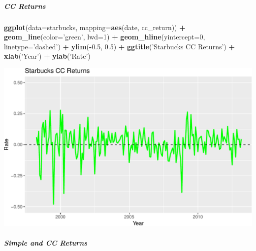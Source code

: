 \documentclass[]{article}
\newenvironment{Shaded}{\begin{snugshade}}{\end{snugshade}}
\newcommand{\KeywordTok}[1]{\textcolor[rgb]{0.13,0.29,0.53}{\textbf{#1}}}
\newcommand{\DataTypeTok}[1]{\textcolor[rgb]{0.13,0.29,0.53}{#1}}
\newcommand{\DecValTok}[1]{\textcolor[rgb]{0.00,0.00,0.81}{#1}}
\newcommand{\FloatTok}[1]{\textcolor[rgb]{0.00,0.00,0.81}{#1}}
\newcommand{\StringTok}[1]{\textcolor[rgb]{0.31,0.60,0.02}{#1}}
\newcommand{\OperatorTok}[1]{\textcolor[rgb]{0.81,0.36,0.00}{\textbf{#1}}}
\newcommand{\NormalTok}[1]{#1}
\let\oldsubparagraph\subparagraph
\renewcommand{\subparagraph}[1]{\oldsubparagraph{#1}\mbox{}}
\begin{document}
\subparagraph{CC Returns}\label{cc-returns}

\begin{Shaded}
\begin{Highlighting}[]
\KeywordTok{ggplot}\NormalTok{(}\DataTypeTok{data=}\NormalTok{starbucks, }\DataTypeTok{mapping=}\KeywordTok{aes}\NormalTok{(date, cc_return)) }\OperatorTok{+}
\StringTok{  }\KeywordTok{geom_line}\NormalTok{(}\DataTypeTok{color=}\StringTok{'green'}\NormalTok{, }\DataTypeTok{lwd=}\DecValTok{1}\NormalTok{) }\OperatorTok{+}
\StringTok{  }\KeywordTok{geom_hline}\NormalTok{(}\DataTypeTok{yintercept=}\DecValTok{0}\NormalTok{, }\DataTypeTok{linetype=}\StringTok{'dashed'}\NormalTok{) }\OperatorTok{+}
\StringTok{  }\KeywordTok{ylim}\NormalTok{(}\OperatorTok{-}\FloatTok{0.5}\NormalTok{, }\FloatTok{0.5}\NormalTok{) }\OperatorTok{+}
\StringTok{  }\KeywordTok{ggtitle}\NormalTok{(}\StringTok{'Starbucks CC Returns'}\NormalTok{) }\OperatorTok{+}
\StringTok{  }\KeywordTok{xlab}\NormalTok{(}\StringTok{'Year'}\NormalTok{) }\OperatorTok{+}
\StringTok{  }\KeywordTok{ylab}\NormalTok{(}\StringTok{'Rate'}\NormalTok{)}
\end{Highlighting}
\end{Shaded}

\includegraphics{homework_1_markdown_files/figure-latex/unnamed-chunk-16-1.pdf}

\subparagraph{Simple and CC Returns}\label{simple-and-cc-returns}
\end{document}
